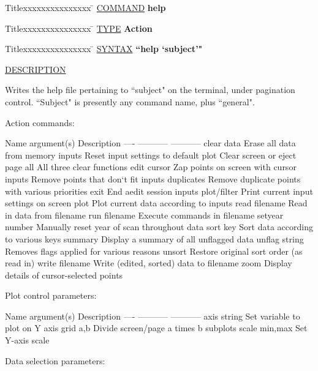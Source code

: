 \begin{tabbing}
Titlexxxxxxxxxxxxxxx \= \kill
\underline{COMMAND} \> {\bf 	help} \\
\end{tabbing}

\begin{tabbing}
Titlexxxxxxxxxxxxxxx \= \kill
\underline{TYPE} \> {\bf 		Action} \\
\end{tabbing}

\begin{tabbing}
Titlexxxxxxxxxxxxxxx \= \kill
\underline{SYNTAX} \> {\bf 		``help `subject'"} \\
\end{tabbing}

\underline{DESCRIPTION}
\begin{list}{}{\setlength{\leftmargin}{0.5in}
     \setlength{\rightmargin}{0in}}
\item
Writes the help file pertaining to ``subject" on the 
terminal, under pagination control.  ``Subject" is
presently any command name, plus ``general".
\item
Action commands:
\item
	Name	argument(s)	Description
	----	-----------     -----------
	clear	data		Erase all data from memory
		inputs		Reset input settings to default
		plot		Clear screen or eject page
		all		All three clear functions
	edit	cursor		Zap points on screen with cursor
		inputs		Remove points that don`t fit inputs
		duplicates	Remove duplicate points with various priorities
	exit			End aedit session
	inputs	plot/filter	Print current input settings on screen
	plot			Plot current data according to inputs
	read	filename	Read in data from filename
	run	filename	Execute commands in filename
	setyear	number		Manually reset year of scan throughout data
	sort	key		Sort data according to various keys
	summary			Display a summary of all unflagged data
	unflag	string		Removes flags applied for various reasons
	unsort			Restore original sort order (as read in)
	write	filename	Write (edited, sorted) data to filename
	zoom			Display details of cursor-selected points
\item
Plot control parameters:
\item
	Name	argument(s)	Description
	----	-----------     -----------
	axis	string		Set variable to plot on Y axis
	grid	a,b		Divide screen/page a times b subplots
	scale	min,max		Set Y-axis scale
\item
Data selection parameters:
\item

\end{list}
